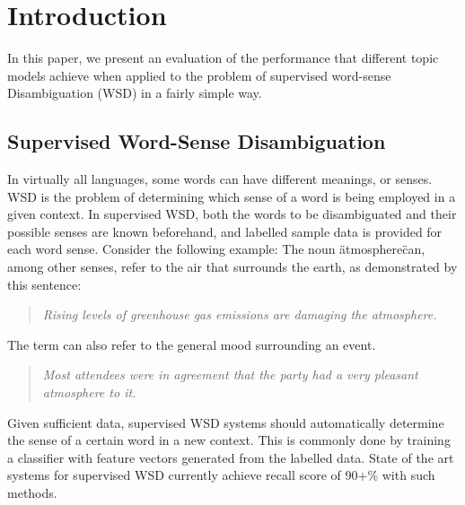 \section{Introduction}
In this paper, we present an evaluation of the performance that different topic models achieve when applied to the problem of supervised word-sense Disambiguation (WSD) in a fairly simple way. 

\subsection{Supervised Word-Sense Disambiguation}
In virtually all languages, some words can have different meanings, or senses. WSD is the problem of determining  which sense of a word is being employed in a given context. In supervised WSD, both the words to be disambiguated and their possible senses are known beforehand, and labelled sample data is provided for each word sense. Consider the following example: The noun \"atmosphere\" can, among other senses, refer to the air that surrounds the earth, as demonstrated by this sentence:\\
\begin{quotation}
\textit{Rising levels of greenhouse gas emissions are damaging the atmosphere.\\}
\end{quotation}
The term can also refer to the general mood surrounding an event. 
\begin{quotation}
\textit{Most attendees were in agreement that the party had a very pleasant atmosphere to it.\\}
\end{quotation}
Given sufficient data, supervised WSD systems should automatically determine the sense of a certain word in a new context. This is commonly done by training a classifier with feature vectors generated from the labelled data. State of the art systems for supervised WSD currently achieve recall score of 90+\%\cite{stateofart_scores} with such methods. 


